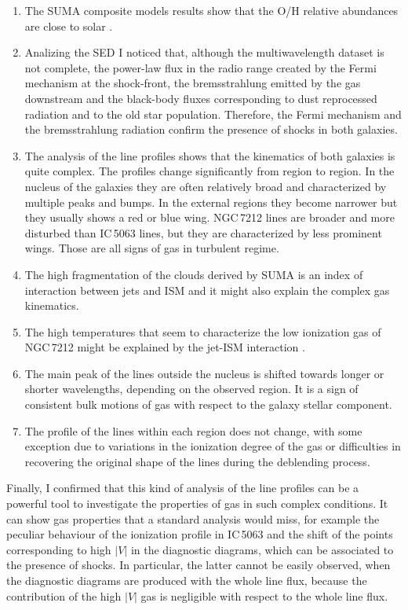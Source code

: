 \documentclass[../thesis.tex]{subfiles}
\begin{document}
\begin{enumerate}
\item The SUMA composite models results show that the O/H relative abundances are close to solar \citep{Allen76}.

\item Analizing the SED I noticed that, although the multiwavelength dataset is not complete, the power-law flux in the radio range created by the Fermi mechanism at the shock-front, the bremsstrahlung emitted by the gas downstream and the black-body fluxes corresponding to dust reprocessed radiation and to the old star population.
Therefore, the Fermi mechanism and the bremsstrahlung radiation confirm the presence of shocks in both galaxies.

\item The analysis of the line profiles shows that the kinematics of both galaxies is quite complex.
The profiles change significantly from region to region. 
In the nucleus of the galaxies they are often relatively broad and characterized by multiple peaks and bumps. 
In the external regions they become narrower but they usually shows a red or blue wing.
NGC\,7212 lines are broader and more disturbed than IC\,5063 lines, but they are characterized by less prominent wings.
Those are all signs of gas in turbulent regime.

\item The high fragmentation of the clouds derived by SUMA is an index of interaction between jets and ISM and it might also explain the complex gas kinematics.

\item The high temperatures that seem to characterize the low ionization gas of NGC\,7212 might be explained by the jet-ISM interaction \citep{Roche16}.

\item The main peak of the lines outside the nucleus is shifted towards longer or shorter wavelengths, depending on the observed region.
It is a sign of consistent bulk motions of gas with respect to the galaxy stellar component.

\item The profile of the lines within each region does not change, with some exception due to variations in the ionization degree of the gas or difficulties in recovering the original shape of the lines during the deblending process.
\end{enumerate}

Finally, I confirmed that this kind of analysis of the line profiles can be a powerful tool to investigate the properties of gas in such complex conditions.
It can show  gas properties that a standard analysis would miss, for example the peculiar behaviour of the ionization profile in IC\,5063 and the shift of the points corresponding to high $\lvert V\rvert$ in the diagnostic diagrams, which can be associated to the presence of shocks.
In particular, the latter cannot be easily observed, when the diagnostic diagrams are produced with the whole line flux, because the contribution of the high $\lvert V\rvert$ gas is negligible with respect to the whole line flux.
\end{document}
